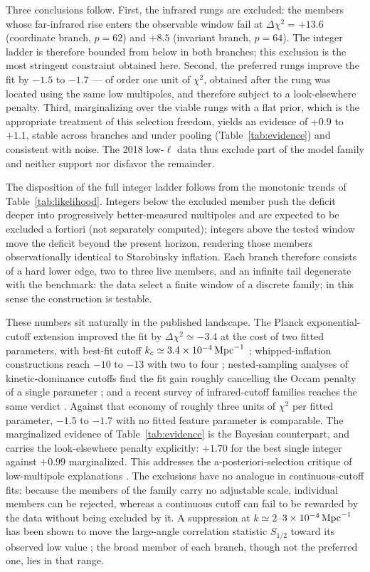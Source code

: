 \documentclass[aps,prd,twocolumn,superscriptaddress,nofootinbib,longbibliography]{revtex4-2}
\newcommand{\Mpc}{\,{\rm Mpc}^{-1}}
\begin{document}
Three conclusions follow. First, the infrared rungs are excluded: the
members whose far-infrared rise enters the observable window fail at
$\Delta\chi^2=+13.6$ (coordinate branch, $p{=}62$) and $+8.5$ (invariant
branch, $p{=}64$). The integer ladder is therefore bounded from below in
both branches; this exclusion is the most stringent constraint obtained here. Second, the preferred rungs improve the fit by $-1.5$ to $-1.7$
--- of order one unit of $\chi^2$, obtained after the rung was located using
the same low multipoles, and therefore subject to a look-elsewhere penalty.
Third, marginalizing over the viable rungs with a flat prior, which is the
appropriate treatment of this selection freedom, yields an evidence of
$+0.9$ to $+1.1$, stable across branches and under pooling
(Table~\ref{tab:evidence}) and consistent with noise. The 2018 low-$\ell$
data thus exclude part of the model family and neither support nor disfavor
the remainder.


The disposition of the full integer ladder follows from the monotonic trends
of Table~\ref{tab:likelihood}. Integers below the excluded member push the
deficit deeper into progressively better-measured multipoles and are
expected to be excluded a fortiori (not separately computed); integers above
the tested window move the deficit beyond the present horizon, rendering
those members observationally identical to Starobinsky inflation. Each
branch therefore consists of a hard lower edge, two to three live members,
and an infinite tail degenerate with the benchmark: the data select a finite
window of a discrete family; in this sense the construction is testable.

These numbers sit naturally in the published landscape. The Planck
exponential-cutoff extension improved the fit by $\Delta\chi^2\simeq-3.4$ at
the cost of two fitted parameters, with best-fit cutoff
$k_c\simeq3.4\times10^{-4}\Mpc$ \cite{Planck2015XX}; whipped-inflation
constructions reach $-10$ to $-13$ with two to four
\cite{Hazra2014,Hazra2016}; nested-sampling analyses of kinetic-dominance
cutoffs find the fit gain roughly cancelling the Occam penalty of a single
parameter \cite{Hergt2019a,Hergt2019b}; and a recent survey of
infrared-cutoff families reaches the same verdict \cite{Upadhyay2026}.
Against that economy of roughly three units of $\chi^2$ per fitted
parameter, $-1.5$ to $-1.7$ with no fitted feature parameter is
comparable. The marginalized evidence of Table~\ref{tab:evidence} is the
Bayesian counterpart, and carries the look-elsewhere penalty
explicitly: $+1.70$ for the best single integer against $+0.99$
marginalized. This addresses the a-posteriori-selection critique of
low-multipole explanations \cite{Bennett2011,Planck2018VII}.
The exclusions have no analogue in continuous-cutoff fits: because the
members of the family carry no adjustable scale, individual members can
be rejected, whereas a continuous cutoff can fail to be rewarded by the
data without being excluded by it. A suppression at
$k\simeq2$--$3\times10^{-4}\Mpc$ has been shown to move the large-angle
correlation statistic $S_{1/2}$ toward its observed low value
\cite{Melia2021,Copi2015}; the broad member of each branch, though not
the preferred one, lies in that range.
\end{document}

